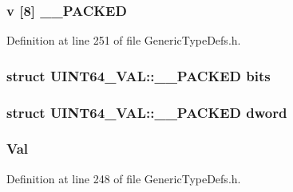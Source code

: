 \subsubsection[{\+\_\+\+\_\+\+P\+A\+C\+K\+E\+D}]{ {\bf v} \mbox{[}8\mbox{]} {\bf \+\_\+\+\_\+\+P\+A\+C\+K\+E\+D}}\label{union_u_i_n_t64___v_a_l_a1200ea45452f549cdb4cfc2fa5d5842f}


Definition at line 251 of file Generic\+Type\+Defs.\+h.

\hypertarget{union_u_i_n_t64___v_a_l_a500a78869a8c173f5190c31ab365578f}{}
\subsubsection[{bits}]{\setlength{\rightskip}{0pt plus 5cm}struct {\bf U\+I\+N\+T64\+\_\+\+V\+A\+L\+::\+\_\+\+\_\+\+P\+A\+C\+K\+E\+D}  bits}\label{union_u_i_n_t64___v_a_l_a500a78869a8c173f5190c31ab365578f}
\hypertarget{union_u_i_n_t64___v_a_l_ae37dd624bb6d29989545a04214326751}{}
\subsubsection[{dword}]{\setlength{\rightskip}{0pt plus 5cm}struct {\bf U\+I\+N\+T64\+\_\+\+V\+A\+L\+::\+\_\+\+\_\+\+P\+A\+C\+K\+E\+D}  dword}\label{union_u_i_n_t64___v_a_l_ae37dd624bb6d29989545a04214326751}
\hypertarget{union_u_i_n_t64___v_a_l_a63ec8f238c3a98b7c5580ae63e7fc78b}{}
\subsubsection[{Val}]{ Val}\label{union_u_i_n_t64___v_a_l_a63ec8f238c3a98b7c5580ae63e7fc78b}


Definition at line 248 of file Generic\+Type\+Defs.\+h.

\hypertarget{union_u_i_n_t64___v_a_l_a389c31af76ebf129e4c0b4c30ace5b51}{}
